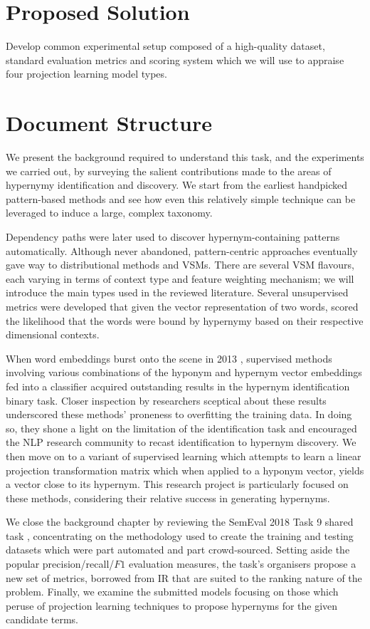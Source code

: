 \section{Proposed Solution}
Develop common experimental setup composed of a high-quality dataset, standard evaluation metrics and scoring system which we will use to appraise four projection learning model types.


\section{Document Structure}
We present the background required to understand this task, and the experiments we carried out, by surveying the salient contributions made to the areas of hypernymy identification and discovery.   We start from the earliest handpicked pattern-based methods and see how even this relatively simple technique can be leveraged to induce a large, complex taxonomy.  

Dependency paths were later used to discover hypernym-containing patterns automatically.  Although never abandoned, pattern-centric approaches eventually gave way to distributional methods and \acl{VSM}s.  There are several \ac{VSM} flavours, each varying in terms of context type and feature weighting mechanism; we will introduce the main types used in the reviewed literature.  Several unsupervised metrics were developed that given the vector representation of two words, scored the likelihood that the words were bound by hypernymy based on their respective dimensional contexts.

When word embeddings burst onto the scene in 2013 \citep{mikolov2013distributed}, supervised methods involving various combinations of the hyponym and hypernym vector embeddings fed into a classifier acquired outstanding results in the hypernym identification binary task.  Closer inspection by researchers sceptical about these results underscored these methods’ proneness to overfitting the training data. In doing so, they shone a light on the limitation of the identification task and encouraged the NLP research community to recast identification to hypernym discovery.  We then move on to a variant of supervised learning which attempts to learn a linear projection transformation matrix which when applied to a hyponym vector, yields a vector close to its hypernym.  This research project is particularly focused on these methods, considering their relative success in generating hypernyms.  

We close the background chapter by reviewing the SemEval 2018 Task 9 shared task \citep{camacho2018semeval}, concentrating on the methodology used to create the training and testing datasets which were part automated and part crowd-sourced.  Setting aside the popular precision/recall/\(F1\) evaluation measures, the task’s organisers propose a new set of metrics, borrowed from \ac{IR} that are suited to the ranking nature of the problem.  Finally, we examine the submitted models focusing on those which peruse of projection learning techniques to propose hypernyms for the given candidate terms.
